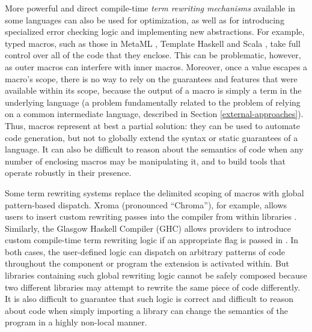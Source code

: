 More powerful and direct compile-time \emph{term rewriting mechanisms} available in some languages can also be used for optimization, as well as for introducing specialized error checking logic and implementing new abstractions. For example, typed macros, such as those in MetaML \cite{Sheard:1999:UMS}, Template Haskell \cite{SheardPeytonJones:Haskell-02} and Scala \cite{ScalaMacros2013}, take full control over all of the code that they enclose. This can be problematic, however, as outer macros can interfere with inner macros. Moreover, once a value escapes a macro's scope, there is no way to rely on the guarantees and features that were available within its scope, because the output of a macro is simply a term in the underlying language (a problem fundamentally related to the problem of relying on a common intermediate language,  described in Section \ref{external-approaches}). Thus, macros represent at best a partial solution: they can be used to automate code generation, but not to globally extend the syntax or static guarantees of a language. It can also be difficult to reason about the semantics of code when any number of enclosing macros may be manipulating it, and to build tools that operate robustly in their presence.

Some term rewriting systems replace the delimited scoping of macros with global pattern-based dispatch. Xroma (pronounced ``Chroma''), for example, allows users to insert custom rewriting passes into the compiler from within libraries \cite{activelibraries}. Similarly, the Glasgow Haskell Compiler (GHC) allows providers to introduce custom compile-time term rewriting logic if an appropriate flag is passed in \cite{jones2001playing}. In both cases, the user-defined logic can dispatch on arbitrary patterns of code throughout the component or program the extension is activated within. But libraries containing such global rewriting logic cannot be safely composed because two different libraries may attempt to rewrite the same piece of code differently. It is also difficult to guarantee that such logic is correct and difficult to reason about code when simply importing a library can change the semantics of the program in a highly non-local manner.


